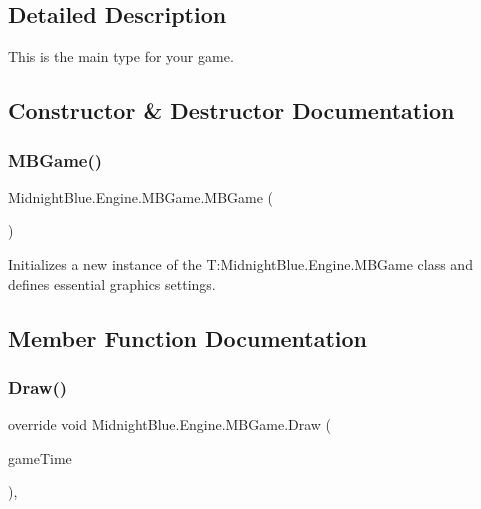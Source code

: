 \subsection{Detailed Description}
This is the main type for your game. 



\subsection{Constructor \& Destructor Documentation}
\hypertarget{class_midnight_blue_1_1_engine_1_1_m_b_game_ab2e659408b8dc4793c370c436e3f5f0f}{}\label{class_midnight_blue_1_1_engine_1_1_m_b_game_ab2e659408b8dc4793c370c436e3f5f0f} 
\subsubsection{\texorpdfstring{M\+B\+Game()}{MBGame()}}
{\footnotesize\ttfamily Midnight\+Blue.\+Engine.\+M\+B\+Game.\+M\+B\+Game (\begin{DoxyParamCaption}{ }\end{DoxyParamCaption})\hspace{0.3cm}{\ttfamily [inline]}}



Initializes a new instance of the T\+:\+Midnight\+Blue.\+Engine.\+M\+B\+Game class and defines essential graphics settings. 



\subsection{Member Function Documentation}
\hypertarget{class_midnight_blue_1_1_engine_1_1_m_b_game_a28dd0bac108b77fe04164ff81acf9881}{}\label{class_midnight_blue_1_1_engine_1_1_m_b_game_a28dd0bac108b77fe04164ff81acf9881} 
\subsubsection{\texorpdfstring{Draw()}{Draw()}}
{\footnotesize\ttfamily override void Midnight\+Blue.\+Engine.\+M\+B\+Game.\+Draw (\begin{DoxyParamCaption}\item[{Game\+Time}]{game\+Time }\end{DoxyParamCaption})\hspace{0.3cm}{\ttfamily [inline]}, {\ttfamily [protected]}}



